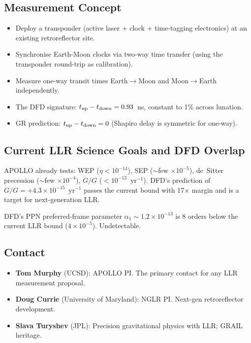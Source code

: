 \documentclass[11pt]{article}
\newcommand{\ee}[1]{\times 10^{#1}}
\begin{document}
\subsection*{Measurement Concept}

\begin{itemize}[nosep]
\item Deploy a transponder (active laser + clock + time-tagging
  electronics) at an existing retroreflector site.
\item Synchronise Earth-Moon clocks via two-way time transfer
  (using the transponder round-trip as calibration).
\item Measure one-way transit times Earth$\to$Moon and
  Moon$\to$Earth independently.
\item The DFD signature: $t_{\rm up} - t_{\rm down} = 0.93$~ns,
  constant to 1\% across lunation.
\item GR prediction: $t_{\rm up} - t_{\rm down} = 0$ (Shapiro
  delay is symmetric for one-way).
\end{itemize}

\subsection*{Current LLR Science Goals and DFD Overlap}

APOLLO already tests: WEP ($\eta < 10^{-14}$), SEP ($\sim$few
$\times 10^{-5}$), de~Sitter precession ($\sim$few $\times 10^{-4}$),
$\dot{G}/G$ ($< 10^{-13}$~yr$^{-1}$). DFD's prediction of
$\dot{G}/G = +4.3\ee{-15}$~yr$^{-1}$ passes the current bound
with 17$\times$ margin and is a target for next-generation LLR.

DFD's PPN preferred-frame parameter $\alpha_1 \sim 1.2\ee{-13}$
is 8 orders below the current LLR bound ($4\ee{-5}$). Undetectable.

\subsection*{Contact}

\begin{itemize}[nosep]
\item \textbf{Tom Murphy} (UCSD): APOLLO PI. The primary contact
  for any LLR measurement proposal.
\item \textbf{Doug Currie} (University of Maryland): NGLR PI.
  Next-gen retroreflector development.
\item \textbf{Slava Turyshev} (JPL): Precision gravitational physics
  with LLR; GRAIL heritage.
\end{itemize}
\end{document}
